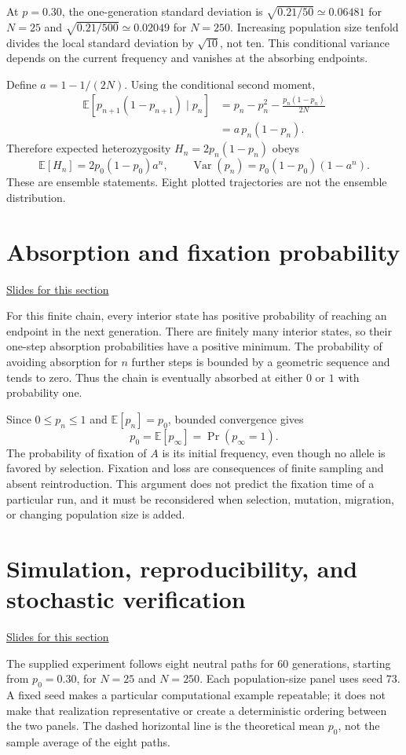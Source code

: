\documentclass[11pt,letterpaper]{article}
\theoremstyle{definition}\newtheorem{definition}{Definition}\newtheorem{example}{Example}
\numberwithin{equation}{section}
\begin{document}
At $p=0.30$, the one-generation standard deviation is $\sqrt{0.21/50}\simeq0.06481$ for $N=25$ and $\sqrt{0.21/500}\simeq0.02049$ for $N=250$. Increasing population size tenfold divides the local standard deviation by $\sqrt{10}$, not ten. This conditional variance depends on the current frequency and vanishes at the absorbing endpoints.

Define $a=1-1/(2N)$. Using the conditional second moment,
\[
\begin{aligned}
\mathbb E[p_{n+1}(1-p_{n+1})\mid p_n]
&=p_n-p_n^2-\frac{p_n(1-p_n)}{2N}\\
&=a\,p_n(1-p_n).
\end{aligned}
\]
Therefore expected heterozygosity $H_n=2p_n(1-p_n)$ obeys
\[
\mathbb E[H_n]=2p_0(1-p_0)a^n,
\qquad \operatorname{Var}(p_n)=p_0(1-p_0)(1-a^n).
\]
These are ensemble statements. Eight plotted trajectories are not the ensemble distribution.
\section{Absorption and fixation probability}
\hypertarget{note-absorption-and-fixation-probability}{}\label{note:absorption-and-fixation-probability}
{\small \href{slides.html\#frame=absorbing-endpoints\&step=1}{Slides for this section}}\par
For this finite chain, every interior state has positive probability of reaching an endpoint in the next generation. There are finitely many interior states, so their one-step absorption probabilities have a positive minimum. The probability of avoiding absorption for $n$ further steps is bounded by a geometric sequence and tends to zero. Thus the chain is eventually absorbed at either $0$ or $1$ with probability one.

Since $0\leq p_n\leq1$ and $\mathbb E[p_n]=p_0$, bounded convergence gives
\[
p_0=\mathbb E[p_\infty]
=\Pr(p_\infty=1).
\]
The probability of fixation of $A$ is its initial frequency, even though no allele is favored by selection. Fixation and loss are consequences of finite sampling and absent reintroduction. This argument does not predict the fixation time of a particular run, and it must be reconsidered when selection, mutation, migration, or changing population size is added.
\section{Simulation, reproducibility, and stochastic verification}
\hypertarget{note-simulation-reproducibility-and-stochastic-verification}{}\label{note:simulation-reproducibility-and-stochastic-verification}
{\small \href{slides.html\#frame=computational-checks-for-a-random-model\&step=1}{Slides for this section}}\par
The supplied experiment follows eight neutral paths for $60$ generations, starting from $p_0=0.30$, for $N=25$ and $N=250$. Each population-size panel uses seed $73$. A fixed seed makes a particular computational example repeatable; it does not make that realization representative or create a deterministic ordering between the two panels. The dashed horizontal line is the theoretical mean $p_0$, not the sample average of the eight paths.
\end{document}
